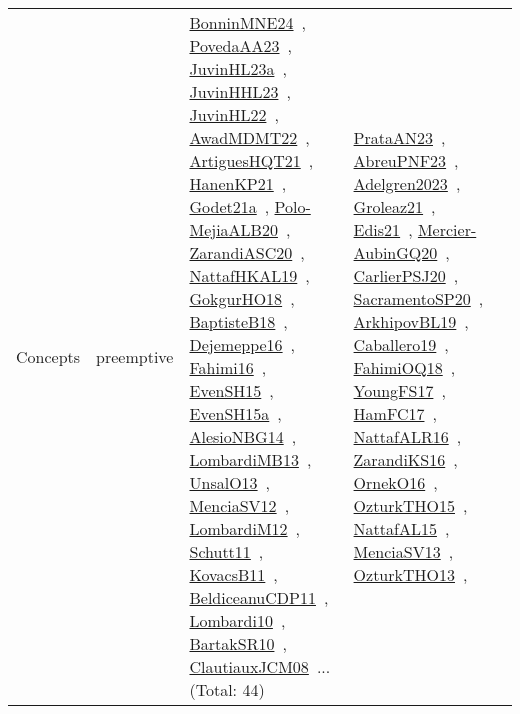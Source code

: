 {\begin{longtable}{lp{3cm}>{\raggedright\arraybackslash}p{6cm}>{\raggedright\arraybackslash}p{6cm}>{\raggedright\arraybackslash}p{8cm}}
\index{preemptive}\index{Concepts!preemptive}Concepts & preemptive & \href{../works/BonninMNE24.pdf}{BonninMNE24}~\cite{BonninMNE24}, \href{../works/PovedaAA23.pdf}{PovedaAA23}~\cite{PovedaAA23}, \href{../works/JuvinHL23a.pdf}{JuvinHL23a}~\cite{JuvinHL23a}, \href{../works/JuvinHHL23.pdf}{JuvinHHL23}~\cite{JuvinHHL23}, \href{../works/JuvinHL22.pdf}{JuvinHL22}~\cite{JuvinHL22}, \href{../works/AwadMDMT22.pdf}{AwadMDMT22}~\cite{AwadMDMT22}, \href{../works/ArtiguesHQT21.pdf}{ArtiguesHQT21}~\cite{ArtiguesHQT21}, \href{../works/HanenKP21.pdf}{HanenKP21}~\cite{HanenKP21}, \href{../works/Godet21a.pdf}{Godet21a}~\cite{Godet21a}, \href{../works/Polo-MejiaALB20.pdf}{Polo-MejiaALB20}~\cite{Polo-MejiaALB20}, \href{../works/ZarandiASC20.pdf}{ZarandiASC20}~\cite{ZarandiASC20}, \href{../works/NattafHKAL19.pdf}{NattafHKAL19}~\cite{NattafHKAL19}, \href{../works/GokgurHO18.pdf}{GokgurHO18}~\cite{GokgurHO18}, \href{../works/BaptisteB18.pdf}{BaptisteB18}~\cite{BaptisteB18}, \href{../works/Dejemeppe16.pdf}{Dejemeppe16}~\cite{Dejemeppe16}, \href{../works/Fahimi16.pdf}{Fahimi16}~\cite{Fahimi16}, \href{../works/EvenSH15.pdf}{EvenSH15}~\cite{EvenSH15}, \href{../works/EvenSH15a.pdf}{EvenSH15a}~\cite{EvenSH15a}, \href{../works/AlesioNBG14.pdf}{AlesioNBG14}~\cite{AlesioNBG14}, \href{../works/LombardiMB13.pdf}{LombardiMB13}~\cite{LombardiMB13}, \href{../works/UnsalO13.pdf}{UnsalO13}~\cite{UnsalO13}, \href{../works/MenciaSV12.pdf}{MenciaSV12}~\cite{MenciaSV12}, \href{../works/LombardiM12.pdf}{LombardiM12}~\cite{LombardiM12}, \href{../works/Schutt11.pdf}{Schutt11}~\cite{Schutt11}, \href{../works/KovacsB11.pdf}{KovacsB11}~\cite{KovacsB11}, \href{../works/BeldiceanuCDP11.pdf}{BeldiceanuCDP11}~\cite{BeldiceanuCDP11}, \href{../works/Lombardi10.pdf}{Lombardi10}~\cite{Lombardi10}, \href{../works/BartakSR10.pdf}{BartakSR10}~\cite{BartakSR10}, \href{../works/ClautiauxJCM08.pdf}{ClautiauxJCM08}~\cite{ClautiauxJCM08}... (Total: 44) & \href{../works/PrataAN23.pdf}{PrataAN23}~\cite{PrataAN23}, \href{../works/AbreuPNF23.pdf}{AbreuPNF23}~\cite{AbreuPNF23}, \href{../works/Adelgren2023.pdf}{Adelgren2023}~\cite{Adelgren2023}, \href{../works/Groleaz21.pdf}{Groleaz21}~\cite{Groleaz21}, \href{../works/Edis21.pdf}{Edis21}~\cite{Edis21}, \href{../works/Mercier-AubinGQ20.pdf}{Mercier-AubinGQ20}~\cite{Mercier-AubinGQ20}, \href{../works/CarlierPSJ20.pdf}{CarlierPSJ20}~\cite{CarlierPSJ20}, \href{../works/SacramentoSP20.pdf}{SacramentoSP20}~\cite{SacramentoSP20}, \href{../works/ArkhipovBL19.pdf}{ArkhipovBL19}~\cite{ArkhipovBL19}, \href{../works/Caballero19.pdf}{Caballero19}~\cite{Caballero19}, \href{../works/FahimiOQ18.pdf}{FahimiOQ18}~\cite{FahimiOQ18}, \href{../works/YoungFS17.pdf}{YoungFS17}~\cite{YoungFS17}, \href{../works/HamFC17.pdf}{HamFC17}~\cite{HamFC17}, \href{../works/NattafALR16.pdf}{NattafALR16}~\cite{NattafALR16}, \href{../works/ZarandiKS16.pdf}{ZarandiKS16}~\cite{ZarandiKS16}, \href{../works/OrnekO16.pdf}{OrnekO16}~\cite{OrnekO16}, \href{../works/OzturkTHO15.pdf}{OzturkTHO15}~\cite{OzturkTHO15}, \href{../works/NattafAL15.pdf}{NattafAL15}~\cite{NattafAL15}, \href{../works/MenciaSV13.pdf}{MenciaSV13}~\cite{MenciaSV13}, \href{../works/OzturkTHO13.pdf}{OzturkTHO13}~\cite{OzturkTHO13}, 
\end{longtable}}
